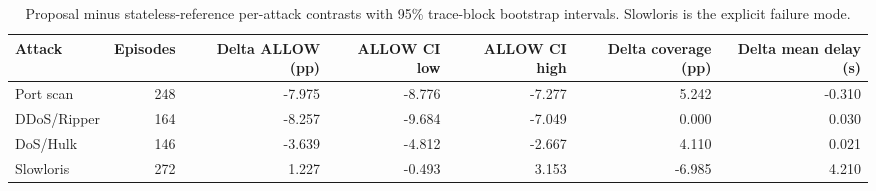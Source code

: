 \begin{table}[t]
\centering
\scriptsize
\caption{Proposal minus stateless-reference per-attack contrasts with 95\% trace-block bootstrap intervals. Slowloris is the explicit failure mode.}
\label{tab:per-attack}
\begin{tabular}{lrrrrrr}
\hline
Attack & Episodes & Delta ALLOW (pp) & ALLOW CI low & ALLOW CI high & Delta coverage (pp) & Delta mean delay (s) \\
\hline
Port scan & 248 & -7.975 & -8.776 & -7.277 & 5.242 & -0.310 \\
DDoS/Ripper & 164 & -8.257 & -9.684 & -7.049 & 0.000 & 0.030 \\
DoS/Hulk & 146 & -3.639 & -4.812 & -2.667 & 4.110 & 0.021 \\
Slowloris & 272 & 1.227 & -0.493 & 3.153 & -6.985 & 4.210 \\
\hline
\end{tabular}
\end{table}
